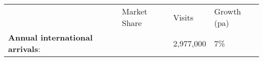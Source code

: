 \begin{tabular}[t]{p{2.95cm}>{\hfill}p{1.35cm}>{\hfill}p{1.1cm}>{\hfill}p{1.7cm}}
   & Market Share & Visits & Growth (pa) \\ 
 \textbf{Annual international arrivals}: &   & 2,977,000 & 7\% \\ 
  \end{tabular}
